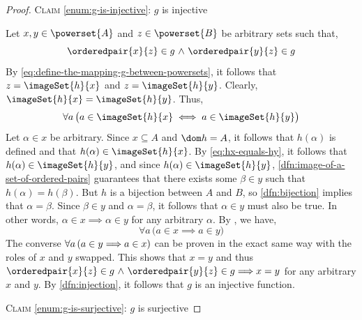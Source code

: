 \begin{proof}
    \vspace{0.3cm}
    \noindent
    {\scshape Claim} \ref{enum:g-is-injective}: \( g \) is injective

    \vspace{0.1cm}
    \noindent
    Let \( x, y \in \powerset{A}\) and \( z \in \powerset{B} \) be arbitrary sets such that,
    \begin{equation}
        \label{eq:gx-and-gy-equals-z}
        \orderedpair{x}{z} \in g \,\,{\land}\,\, \orderedpair{y}{z} \in g
    \end{equation}
    By \eqref{eq:define-the-mapping-g-between-powersets}, it follows that \( z = \imageSet{h}{x} \) and \( z = \imageSet{h}{y} \).
    Clearly, \( \imageSet{h}{x} = \imageSet{h}{y} \). Thus,
    \begin{equation}
        \label{eq:hx-equals-hy}
        \forall a \, \big( a \in \imageSet{h}{x} \iff a \in \imageSet{h}{y} \big)
    \end{equation}
    Let \( \alpha \in x \) be arbitrary. Since \( x \subseteq A \) and \( \dom h = A \), it follows that \( h(\alpha) \) is defined and that
    \( h(\alpha) \in \imageSet{h}{x} \). By \eqref{eq:hx-equals-hy}, it follows that \( h(\alpha) \in \imageSet{h}{y} \), and since \( h(\alpha) \in \imageSet{h}{y} \),
    \cref{dfn:image-of-a-set-of-ordered-pairs} guarantees that there exists some \( \beta \in y \) such that \( h(\alpha) = h(\beta) \).
    But \( h \) is a bijection between \( A \) and \( B \), so \cref{dfn:bijection} implies that \( \alpha = \beta \).
    Since \( \beta \in y \) and \( \alpha = \beta \), it follows that \( \alpha \in y \) must also be true. In other words,
    \( \alpha \in x {\implies} \alpha \in y \) for any arbitrary \( \alpha \). By , we have,
    \begin{equation*}
        \forall a \, \big( a \in x \implies a \in y \big)
    \end{equation*}
    The converse \( \forall a \, \mleft( a \in y {\implies} a \in x \mright) \) can be proven in the exact same way with the roles of \( x \) and \( y \) swapped.
    This shows that \( x = y \) and thus \( \orderedpair{x}{z} \in g \,\,{\land}\,\, \orderedpair{y}{z} \in g {\implies} x = y \) for any arbitrary \( x \) and \( y \).
    By \cref{dfn:injection}, it follows that \( g \) is an injective function.

    \vspace{0.3cm}
    \noindent
    {\scshape Claim} \ref{enum:g-is-surjective}: \( g \) is surjective


\end{proof}
